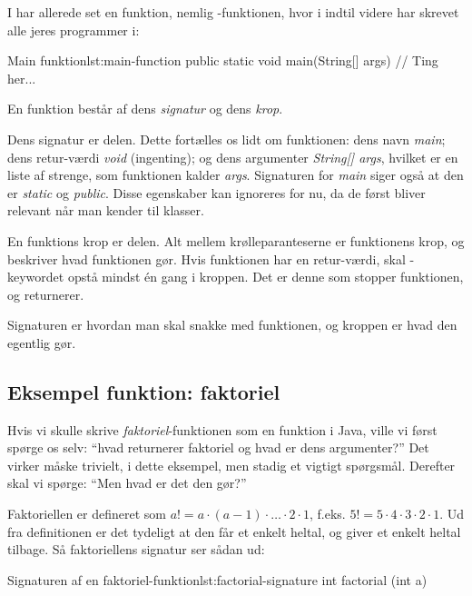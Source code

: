 		I har allerede set en funktion, nemlig -funktionen, hvor i
		indtil videre har skrevet alle jeres programmer i:

		\begin{JavaCode}{Main funktion}{lst:main-function}
			public static void main(String[] args) {
				// Ting her...
			}
		\end{JavaCode}

		En funktion består af dens \emph{signatur} og dens \emph{krop}.

        Dens signatur er 
        delen.  Dette fortælles os lidt om funktionen: dens
        navn \emph{main}; dens retur-værdi \emph{void} (ingenting); og
        dens argumenter \emph{String[] args}, hvilket er en liste af
        strenge, som funktionen kalder \emph{args}.  Signaturen for
        \emph{main} siger også at den er \emph{static} og
        \emph{public}. Disse egenskaber kan ignoreres for nu, da de
        først bliver relevant når man kender til klasser.

		En funktions krop er  delen. Alt mellem
		krølleparanteserne er funktionens krop, og beskriver hvad funktionen gør.
		Hvis funktionen har en retur-værdi, skal -keywordet opstå
		mindst én gang i kroppen. Det er denne som stopper funktionen, og returnerer.

        Signaturen er hvordan man skal snakke med funktionen, og
        kroppen er hvad den egentlig gør.

	\subsection{Eksempel funktion: faktoriel}

		Hvis vi skulle skrive \emph{faktoriel}-funktionen som en funktion i Java,
		ville vi først spørge os selv: ``hvad returnerer faktoriel og hvad er dens
		argumenter?'' Det virker måske trivielt, i dette eksempel, men stadig et
		vigtigt spørgsmål. Derefter skal vi spørge: ``Men hvad er det den gør?''

		Faktoriellen er defineret som \(a! = a \cdot (a-1) \cdot \dots \cdot 2 \cdot 1\),
		f.eks. \(5! = 5 \cdot 4 \cdot 3 \cdot 2 \cdot 1\). Ud fra definitionen er det
		tydeligt at den får et enkelt heltal, og giver et enkelt heltal tilbage. Så
		faktoriellens signatur ser sådan ud:

		\begin{JavaCode}{Signaturen af en faktoriel-funktion}{lst:factorial-signature}
			int factorial (int a)
		\end{JavaCode}

